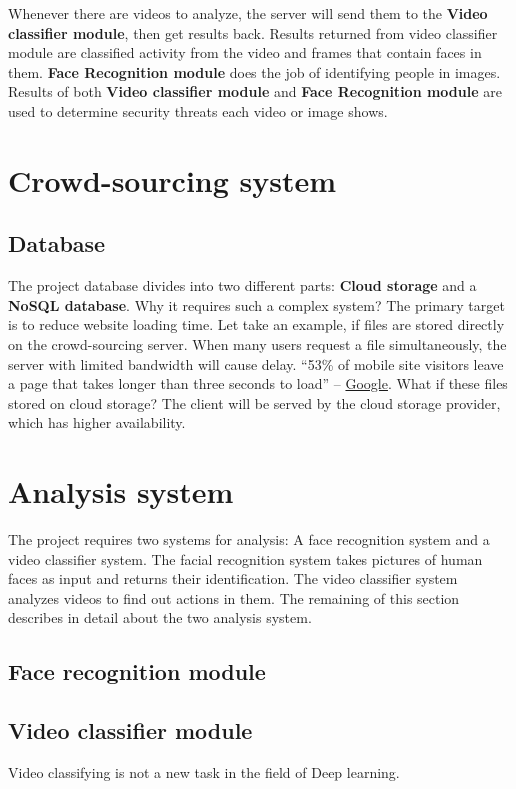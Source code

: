 Whenever there are videos to analyze, the server will send them to the \textbf{Video classifier module}, then get results back. Results returned from video classifier module are classified activity from the video and frames that contain faces in them. \textbf{Face Recognition module} does the job of identifying people in images. Results of both \textbf{Video classifier module} and \textbf{Face Recognition module} are used to determine security threats each video or image shows.
\section{Crowd-sourcing system}
\subsection{Database}
The project database divides into two different parts: \textbf{Cloud storage} and a \textbf{NoSQL database}. Why it requires such a complex system? The primary target is to reduce website loading time. Let take an example, if files are stored directly on the crowd-sourcing server. When many users request a file simultaneously, the server with limited bandwidth will cause delay. “53\% of mobile site visitors leave a page that takes longer than three seconds to load” – \href{https://think.storage.googleapis.com/docs/mobile-page-speed-new-industry-benchmarks.pdf}{Google}. What if these files stored on cloud storage? The client will be served by the cloud storage provider, which has higher availability.
\section{Analysis system}
The project requires two systems for analysis: A face recognition system and a video classifier system. The facial recognition system takes pictures of human faces as input and returns their identification. The video classifier system analyzes videos to find out actions in them. The remaining of this section describes in detail about the two analysis system.
\subsection{Face recognition module}
\subsection{Video classifier module}
Video classifying is not a new task in the field of Deep learning.
	
